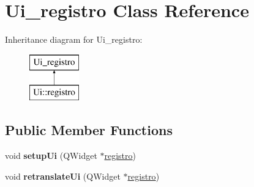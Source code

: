 \hypertarget{class_ui__registro}{}\section{Ui\+\_\+registro Class Reference}
\label{class_ui__registro}
Inheritance diagram for Ui\+\_\+registro\+:\begin{figure}[H]
\begin{center}
\leavevmode
\includegraphics[height=2.000000cm]{class_ui__registro}
\end{center}
\end{figure}
\subsection*{Public Member Functions}
\begin{DoxyCompactItemize}
\item 
\mbox{\label{class_ui__registro_a35262f801bcc8d2d7cd712cb88dcc265}} 
void {\bfseries setup\+Ui} (Q\+Widget $\ast$\hyperlink{classregistro}{registro})
\item 
\mbox{\label{class_ui__registro_a862cab2b7154b318c2ec1ef283bfd0dd}} 
void {\bfseries retranslate\+Ui} (Q\+Widget $\ast$\hyperlink{classregistro}{registro})
\end{DoxyCompactItemize}
